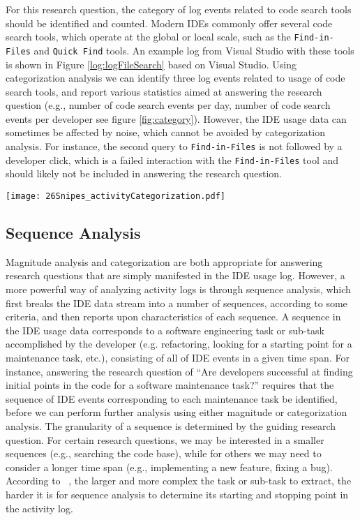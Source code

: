 For this research question, the category of log events related to code search tools should be identified and counted. Modern IDEs commonly offer several code search tools, which operate at the global or local scale, such as the {\tt Find-in-Files} and {\tt Quick Find} tools.  An example log from Visual Studio with these tools is shown in Figure \ref{log:logFileSearch} based on Visual Studio. Using categorization analysis we can identify three
log events related to usage of code search tools, and report various statistics aimed at answering the research question (e.g., number of code search events per day, number of code search events per developer see figure \ref{fig:category}). However, the IDE usage data can sometimes be affected by noise, which cannot be avoided by categorization analysis. For instance, the second query to {\tt Find-in-Files} is not followed by a developer click, which is a failed interaction with the {\tt Find-in-Files} tool and should likely not be included in answering the research question.


\begin{figure*}[t]
\centering

\texttt{[image: 26Snipes\_activityCategorization.pdf]}
\caption{Categorized Log Events with Search Category}
\label{fig:category}
\end{figure*}


\subsection{Sequence Analysis}

Magnitude analysis and categorization are both appropriate for answering research questions that are simply manifested in the IDE usage log. However, a more powerful way of analyzing activity logs is through sequence analysis, which first breaks the IDE data stream into a number of sequences, according to some criteria, and then reports upon characteristics of each sequence. A sequence in the IDE usage data corresponds to a software engineering task or sub-task accomplished by the developer (e.g. refactoring, looking for a starting point for a maintenance task, etc.), consisting of all of IDE events in a given time span. For instance, answering the research question of ``Are developers successful at finding initial points in the code for a software maintenance task?'' requires that the sequence of IDE events corresponding to each maintenance task be identified, before we can perform further analysis using either magnitude or categorization analysis. The granularity of a sequence is determined by the guiding research question. For certain research questions, we may be interested in a smaller sequences (e.g., searching the code base), while for others we may need to consider a longer time span (e.g., implementing a new feature, fixing a bug). 
According to ~, the larger and more complex the task or sub-task to extract, the harder it is for sequence analysis to determine its starting and stopping point in the activity log.

